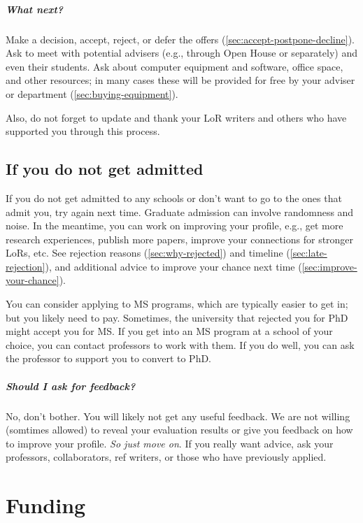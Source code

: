 \documentclass[oneside,11pt,dvipsnames]{book}
\begin{document}
\paragraph{What next?} Make a decision, accept, reject, or defer the offers  (\autoref{sec:accept-postpone-decline}). Ask to meet with potential advisers (e.g., through Open House or separately) and even their students. Ask about computer equipment and software, office space, and other resources; in many cases these will be provided for free by your adviser or department (\autoref{sec:buying-equipment}).

Also, do not forget to update and thank your LoR writers and others who have supported you through this process.

\section{If you do not get admitted}\label{sec:not-accepted} 

If you do not get admitted to any schools or don't want to go to the ones that admit you, try again next time.  Graduate admission can involve randomness and noise. In the meantime, you can work on improving your profile, e.g., get more research experiences, publish more papers, improve your connections for stronger LoRs, etc. See rejection reasons (\autoref{sec:why-rejected}) and timeline (\autoref{sec:late-rejection}), and additional advice to improve your chance next time (\autoref{sec:improve-your-chance}).

You can consider applying to MS programs, which are typically easier to get in; but you likely need to pay.  Sometimes, the university that rejected you for PhD might accept you for MS.
If you get into an MS program at a school of your choice, you can contact professors to work with them. If you do well, you can ask the professor to support you to convert to PhD.

\paragraph{Should I ask for feedback?}
No, don't bother.  You will likely not get any useful feedback.  We are not willing (somtimes allowed) to reveal your evaluation results or give you feedback on how to improve your profile. \emph{So just move on}.  If you really want advice, ask your professors, collaborators, ref writers, or those who have previously applied.


\chapter{Funding}\label{sec:funding}
\end{document}
